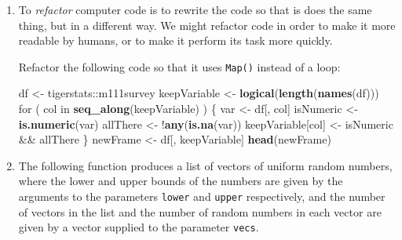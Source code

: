\documentclass[]{book}
\makeatletter
\newenvironment{Shaded}{\begin{snugshade}}{\end{snugshade}}
\newcommand{\KeywordTok}[1]{\textcolor[rgb]{0.13,0.29,0.53}{\textbf{{#1}}}}
\newcommand{\StringTok}[1]{\textcolor[rgb]{0.31,0.60,0.02}{{#1}}}
\newcommand{\NormalTok}[1]{{#1}}
\newenvironment{kframe}{%
\medskip{}
\setlength{\fboxsep}{.8em}
 \def\at@end@of@kframe{}%
 \ifinner\ifhmode%
  \def\at@end@of@kframe{\end{minipage}}%
  \begin{minipage}{\columnwidth}%
 \fi\fi%
 \def\FrameCommand##1{\hskip\@totalleftmargin \hskip-\fboxsep
 \colorbox{shadecolor}{##1}\hskip-\fboxsep
     \hskip-\linewidth \hskip-\@totalleftmargin \hskip\columnwidth}%
 \MakeFramed {\advance\hsize-\width
   \@totalleftmargin\z@ \linewidth\hsize
   \@setminipage}}%
 {\par\unskip\endMakeFramed%
 \at@end@of@kframe}
\renewenvironment{Shaded}{\begin{kframe}}{\end{kframe}}
\theoremstyle{definition}
\theoremstyle{definition}
\theoremstyle{remark}
\makeatother
\begin{document}
{\begin{enumerate}
\begin{Shaded}
\begin{Highlighting}[]
\KeywordTok{Map}\NormalTok{(function(x) }\KeywordTok{sqrt}\NormalTok{(x), y)}
\end{Highlighting}
\end{Shaded}

  Or this code?

\begin{Shaded}
\begin{Highlighting}[]
  \KeywordTok{sqrt}\NormalTok{(y)}
\end{Highlighting}
\end{Shaded}

  Justify your answer with a convincing example, using
  \texttt{system.time()}. What moral do you draw from this?
\item
  To \emph{refactor} computer code is to rewrite the
  code so that is does the same thing, but in a different way. We might
  refactor code in order to make it more readable by humans, or to make
  it perform its task more quickly.

  Refactor the following code so that it uses \texttt{Map()} instead of
  a loop:

\begin{Shaded}
\begin{Highlighting}[]
\NormalTok{df <-}\StringTok{ }\NormalTok{tigerstats::m111survey}
\NormalTok{keepVariable <-}\StringTok{ }\KeywordTok{logical}\NormalTok{(}\KeywordTok{length}\NormalTok{(}\KeywordTok{names}\NormalTok{(df)))}
\NormalTok{for ( col in }\KeywordTok{seq_along}\NormalTok{(keepVariable) ) \{}
  \NormalTok{var <-}\StringTok{ }\NormalTok{df[, col]}
  \NormalTok{isNumeric <-}\StringTok{ }\KeywordTok{is.numeric}\NormalTok{(var)}
  \NormalTok{allThere <-}\StringTok{ }\NormalTok{!}\KeywordTok{any}\NormalTok{(}\KeywordTok{is.na}\NormalTok{(var))}
  \NormalTok{keepVariable[col] <-}\StringTok{ }\NormalTok{isNumeric &&}\StringTok{ }\NormalTok{allThere}
\NormalTok{\}}
\NormalTok{newFrame <-}\StringTok{ }\NormalTok{df[, keepVariable]}
\KeywordTok{head}\NormalTok{(newFrame)}
\end{Highlighting}
\end{Shaded}
\item
  The following function produces a list of vectors of uniform random
  numbers, where the lower and upper bounds of the numbers are given by
  the arguments to the parameters \texttt{lower} and \texttt{upper}
  respectively, and the number of vectors in the list and the number of
  random numbers in each vector are given by a vector supplied to the
  parameter \texttt{vecs}.


\end{enumerate}}
\end{document}
